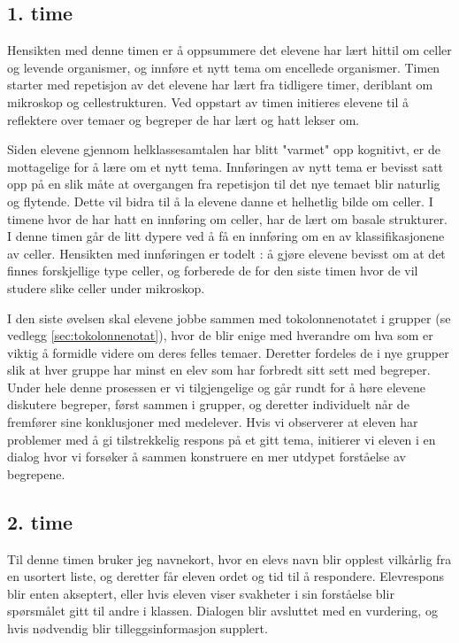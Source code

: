 \documentclass[main.tex]{subfiles}
\begin{document}
\subsection*{1. time}

Hensikten med denne timen er å oppsummere det elevene har lært hittil om celler og 
levende organismer, og innføre et nytt tema om encellede organismer. Timen starter med repetisjon 
av det elevene har lært fra tidligere timer, deriblant om mikroskop og cellestrukturen. Ved oppstart 
av timen initieres elevene til å reflektere over temaer og begreper de har lært og hatt lekser 
om.
 
Siden elevene gjennom helklassesamtalen har blitt "varmet" opp kognitivt, er de mottagelige for å 
lære om et nytt tema. Innføringen av nytt tema er bevisst satt opp på en slik måte at overgangen 
fra repetisjon til det nye temaet blir naturlig og flytende. Dette vil bidra til å la elevene danne et 
helhetlig bilde om celler. I timene hvor de har hatt en innføring om celler, har de lært om basale 
strukturer. I denne timen går de litt dypere ved å få en innføring om en av klassifikasjonene av celler.
Hensikten med innføringen er todelt : å gjøre elevene bevisst om at det finnes forskjellige type
celler, og forberede de for den siste timen hvor de vil studere slike celler under mikroskop.
 
I den siste øvelsen skal elevene jobbe sammen med tokolonnenotatet i grupper (se 
vedlegg \ref{sec:tokolonnenotat}), hvor de blir enige med hverandre om hva som er viktig å formidle videre 
om deres felles temaer. Deretter fordeles de i nye grupper slik at hver gruppe har minst en elev som har 
forbredt sitt sett med begreper. Under hele denne prosessen er vi tilgjengelige og går rundt for å 
høre elevene diskutere begreper, først sammen i grupper, og deretter individuelt når de fremfører sine 
konklusjoner med medelever. Hvis vi observerer at eleven har problemer med å gi tilstrekkelig 
respons på et gitt tema, initierer vi eleven i en dialog hvor vi forsøker å sammen konstruere en 
mer utdypet forståelse av begrepene. 

\subsection*{2. time}

Til denne timen bruker jeg navnekort, hvor en elevs navn blir opplest vilkårlig fra en usortert liste, 
og deretter får eleven 
ordet og tid til å respondere. Elevrespons blir enten akseptert, eller hvis eleven viser svakheter
i sin forståelse blir spørsmålet gitt til andre i klassen. Dialogen blir avsluttet med en vurdering,
og hvis nødvendig blir tilleggsinformasjon supplert. 
\end{document}

